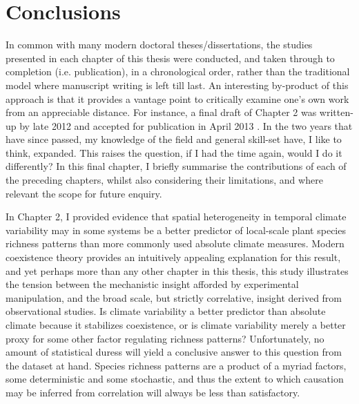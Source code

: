 
\graphicspath{{Chapter6/Figs}}

\chapter{Conclusions}  %

In common with many modern doctoral theses/dissertations, the studies presented in each chapter of this thesis were conducted, and taken through to completion (i.e. publication), in a chronological order, rather than the traditional model where manuscript writing is left till last. An interesting by-product of this approach is that it provides a vantage point to critically examine one's own work from an appreciable distance. For instance, a final draft of Chapter 2 was written-up by late 2012 and accepted for publication in April 2013 \citep{Letten2013}. In the two years that have since passed, my knowledge of the field and general skill-set have, I like to think, expanded. This raises the question, if I had the time again, would I do it differently? In this final chapter, I briefly summarise the contributions of each of the preceding chapters, whilst also considering their limitations, and where relevant the scope for future enquiry.

In Chapter 2, I provided evidence that spatial heterogeneity in temporal climate variability may in some systems be a better predictor of local-scale plant species richness patterns than more commonly used absolute climate measures. Modern coexistence theory \citep[\textit{sensu}][]{Chesson2000} provides an intuitively appealing explanation for this result, and yet perhaps more than any other chapter in this thesis, this study illustrates the tension between the mechanistic insight afforded by experimental manipulation, and the broad scale, but strictly correlative, insight derived from observational studies. Is climate variability a better predictor than absolute climate because it stabilizes coexistence, or is climate variability merely a better proxy for some other factor regulating richness patterns? Unfortunately, no amount of statistical duress will yield a conclusive answer to this question from the dataset at hand. Species richness patterns are a product of a myriad factors, some deterministic and some stochastic, and thus the extent to which causation may be inferred from correlation will always be less than satisfactory.  

